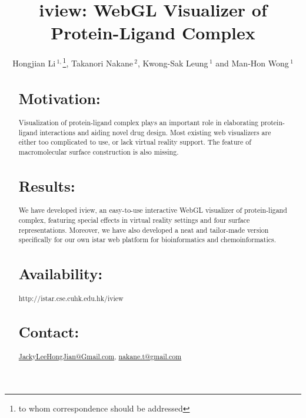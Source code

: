 \documentclass{bioinfo}
\begin{document}

\title[iview]{iview: WebGL Visualizer of Protein-Ligand Complex}
\author[Hongjian Li \textit{et~al}]{Hongjian Li\,$^{1,}$\footnote{to whom correspondence should be addressed}, Takanori Nakane\,$^{2}$, Kwong-Sak Leung\,$^{1}$ and Man-Hon Wong\,$^{1}$}
\address{$^{1}$Department of Computer Science and Engineering, Chinese University of Hong Kong, Hong Kong\\
$^{2}$Graduate School of Medicine, Kyoto University, Japan}



\maketitle

\begin{abstract}

\section{Motivation:}
Visualization of protein-ligand complex plays an important role in elaborating protein-ligand interactions and aiding novel drug design. Most existing web visualizers are either too complicated to use, or lack virtual reality support. The feature of macromolecular surface construction is also missing.

\section{Results:}
We have developed iview, an easy-to-use interactive WebGL visualizer of protein-ligand complex, featuring special effects in virtual reality settings and four surface representations. Moreover, we have also developed a neat and tailor-made version specifically for our own istar web platform for bioinformatics and chemoinformatics.

\section{Availability:}
http://istar.cse.cuhk.edu.hk/iview

\section{Contact:} \href{JackyLeeHongJian@Gmail.com}{JackyLeeHongJian@Gmail.com}, \href{nakane.t@gmail.com}{nakane.t@gmail.com}
\end{abstract}
\end{document}
